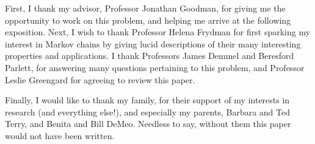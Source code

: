 First, I thank my advisor, Professor Jonathan Goodman, for giving me the opportunity to work on
this problem, and helping me arrive at the following exposition. Next, I wish to thank Professor
Helena Frydman for ﬁrst sparking my interest in Markov chains by giving lucid descriptions of their
many interesting properties and applications. I thank Professors James Demmel and Beresford
Parlett, for answering many questions pertaining to this problem, and Professor Leslie Greengard
for agreeing to review this paper.

Finally, I would like to thank my family, for their support of my interests in research (and
everything else!), and especially my parents, Barbara and Ted Terry, and Benita and Bill DeMeo.
Needless to say, without them this paper would not have been written.

